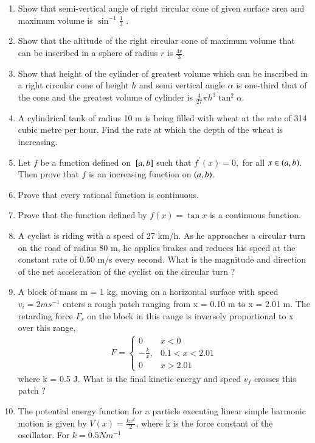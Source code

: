 \begin{enumerate}[label=\arabic*.,ref=\thesubsection.\theenumi]
\item  Show that semi-vertical angle of right circular cone of given surface area and maximum volume is $\sin^{-1} \frac{1}{ 3}$
.
\item Show that the altitude of the right circular cone of maximum volume that can be inscribed in a sphere of radius $r$ is $\frac{4r}{ 3}$.
\item Show that height of the cylinder of greatest volume which can be inscribed in a right circular cone of height $h$ and semi vertical angle $\alpha $ is one-third that of the cone and the greatest volume of cylinder is $\frac{4}{27} \pi h^3 \tan^2\alpha $.
\item A cylindrical tank of radius 10 m is being filled with wheat at the rate of 314 cubic metre per hour. Find the rate at which the depth of the wheat is increasing.
\item Let $f$ be a function defined on ${}\left[a,b\right]$ such that $f^{\prime}(x) = 0,$ for all $x \in \left(a,b\right)$.  Then prove that $f$ is an increasing function on $\left(a,b\right)$.
%
\item Prove that every rational function is continuous.
\item Prove that the function defined by $f(x) = \tan x$ is a continuous function.
\item  A cyclist is riding with a speed of 27 km/h. As he approaches a circular turn on the road of radius 80 m, he applies brakes and reduces his speed at the constant rate of 0.50 m/s every second. What is the magnitude and direction of the net acceleration of the cyclist on the circular turn ?
\item A block of mass m = 1 kg, moving on a horizontal surface with speed $v_i
= 2 m s^{-1}$
enters a rough patch ranging from x = 0.10 m to x = 2.01 m. The retarding force $F_r$
on the block in this range is inversely proportional to x over this range,
%
\begin{align}
 F = 
\begin{cases}
 0 & x < 0
\\
-\frac{k}{ x}, & 0.1 < x < 2.01 
\\
0 & x > 2.01 
\end{cases}
\end{align}
%
where k = 0.5 J. What is the final kinetic energy and speed $v_f$
crosses this patch ?
\item The potential energy function for a particle executing linear simple harmonic motion is given by $V(x) = \frac{kx^2}{2}$, where k is the force constant of the oscillator. For $k = 0.5 N m^{-1}$

\end{enumerate}

